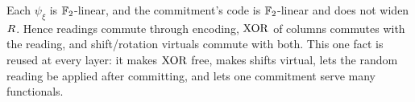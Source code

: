 \begin{remark}
\label{rem:linearity-thread}
Each $\psi_\xi$ is $\mathbb{F}_2$-linear, and the commitment's code is $\mathbb{F}_2$-linear
and does not widen $R$. Hence readings commute through encoding, $\operatorname{XOR}$
of columns commutes with the reading, and shift/rotation virtuals commute with
both. This one fact is reused at every layer: it makes $\operatorname{XOR}$ free, makes shifts
virtual, lets the random reading be applied after committing, and lets one
commitment serve many functionals.
\end{remark}

